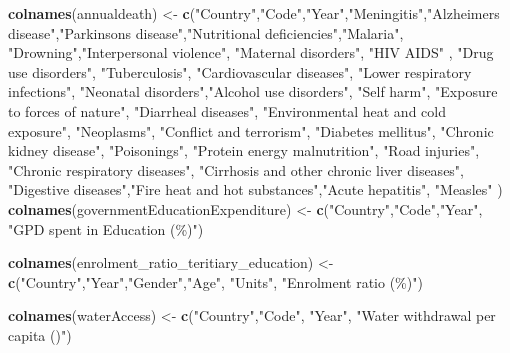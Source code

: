 \documentclass[
]{article}
\newenvironment{Shaded}{\begin{snugshade}}{\end{snugshade}}
\newcommand{\FunctionTok}[1]{\textcolor[rgb]{0.13,0.29,0.53}{\textbf{#1}}}
\newcommand{\NormalTok}[1]{#1}
\newcommand{\OtherTok}[1]{\textcolor[rgb]{0.56,0.35,0.01}{#1}}
\newcommand{\StringTok}[1]{\textcolor[rgb]{0.31,0.60,0.02}{#1}}
\begin{document}
\begin{Shaded}
\begin{Highlighting}[]
\FunctionTok{colnames}\NormalTok{(annualdeath) }\OtherTok{\textless{}{-}} \FunctionTok{c}\NormalTok{(}\StringTok{"Country"}\NormalTok{,}\StringTok{"Code"}\NormalTok{,}\StringTok{"Year"}\NormalTok{,}\StringTok{"Meningitis"}\NormalTok{,}\StringTok{"Alzheimers disease"}\NormalTok{,}\StringTok{"Parkinsons disease"}\NormalTok{,}\StringTok{"Nutritional deficiencies"}\NormalTok{,}\StringTok{"Malaria"}\NormalTok{,}
\StringTok{"Drowning"}\NormalTok{,}\StringTok{"Interpersonal violence"}\NormalTok{, }\StringTok{"Maternal disorders"}\NormalTok{, }\StringTok{"HIV AIDS"}\NormalTok{ , }\StringTok{"Drug use disorders"}\NormalTok{, }\StringTok{"Tuberculosis"}\NormalTok{, }\StringTok{"Cardiovascular diseases"}\NormalTok{, }\StringTok{"Lower respiratory infections"}\NormalTok{, }\StringTok{"Neonatal disorders"}\NormalTok{,}\StringTok{"Alcohol use disorders"}\NormalTok{, }\StringTok{"Self harm"}\NormalTok{, }\StringTok{"Exposure to forces of nature"}\NormalTok{, }\StringTok{"Diarrheal diseases"}\NormalTok{, }\StringTok{"Environmental heat and cold exposure"}\NormalTok{, }\StringTok{"Neoplasms"}\NormalTok{, }\StringTok{"Conflict and terrorism"}\NormalTok{, }\StringTok{"Diabetes mellitus"}\NormalTok{, }\StringTok{"Chronic kidney disease"}\NormalTok{, }\StringTok{"Poisonings"}\NormalTok{, }\StringTok{"Protein energy malnutrition"}\NormalTok{, }\StringTok{"Road injuries"}\NormalTok{, }\StringTok{"Chronic respiratory diseases"}\NormalTok{, }\StringTok{"Cirrhosis and other chronic liver diseases"}\NormalTok{, }\StringTok{"Digestive diseases"}\NormalTok{,}\StringTok{"Fire heat and hot substances"}\NormalTok{,}\StringTok{"Acute hepatitis"}\NormalTok{, }\StringTok{"Measles"}
\NormalTok{)}
\FunctionTok{colnames}\NormalTok{(governmentEducationExpenditure) }\OtherTok{\textless{}{-}} \FunctionTok{c}\NormalTok{(}\StringTok{"Country"}\NormalTok{,}\StringTok{"Code"}\NormalTok{,}\StringTok{"Year"}\NormalTok{, }\StringTok{"GPD spent in Education (\%)"}\NormalTok{)}

\FunctionTok{colnames}\NormalTok{(enrolment\_ratio\_teritiary\_education) }\OtherTok{\textless{}{-}} \FunctionTok{c}\NormalTok{(}\StringTok{"Country"}\NormalTok{,}\StringTok{"Year"}\NormalTok{,}\StringTok{"Gender"}\NormalTok{,}\StringTok{"Age"}\NormalTok{, }\StringTok{"Units"}\NormalTok{, }\StringTok{"Enrolment ratio (\%)"}\NormalTok{)}

\FunctionTok{colnames}\NormalTok{(waterAccess) }\OtherTok{\textless{}{-}} \FunctionTok{c}\NormalTok{(}\StringTok{"Country"}\NormalTok{,}\StringTok{"Code"}\NormalTok{, }\StringTok{"Year"}\NormalTok{, }\StringTok{"Water withdrawal per capita ()"}\NormalTok{)}


\end{Highlighting}
\end{Shaded}
\end{document}

